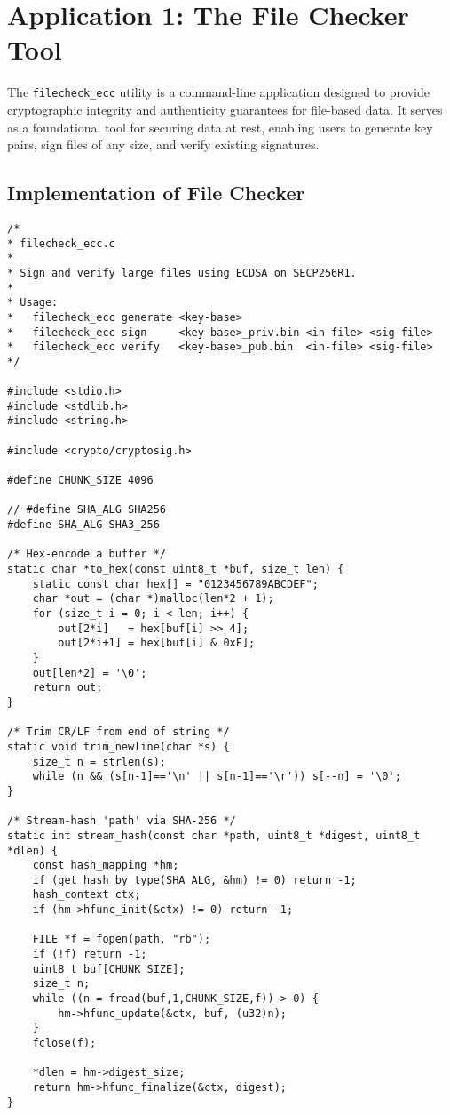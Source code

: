 \chapter{Application 1: The File Checker Tool}
The \texttt{filecheck\_ecc} utility is a command-line application designed to provide cryptographic integrity and authenticity guarantees for file-based data. It serves as a foundational tool for securing data at rest, enabling users to generate key pairs, sign files of any size, and verify existing signatures.

\section{Implementation of File Checker}
\begin{lstlisting}[style=cstyle]
/*
* filecheck_ecc.c
*
* Sign and verify large files using ECDSA on SECP256R1.
*
* Usage:
*   filecheck_ecc generate <key-base>
*   filecheck_ecc sign     <key-base>_priv.bin <in-file> <sig-file>
*   filecheck_ecc verify   <key-base>_pub.bin  <in-file> <sig-file>
*/

#include <stdio.h>
#include <stdlib.h>
#include <string.h>

#include <crypto/cryptosig.h>

#define CHUNK_SIZE 4096

// #define SHA_ALG SHA256
#define SHA_ALG SHA3_256

/* Hex-encode a buffer */
static char *to_hex(const uint8_t *buf, size_t len) {
	static const char hex[] = "0123456789ABCDEF";
	char *out = (char *)malloc(len*2 + 1);
	for (size_t i = 0; i < len; i++) {
		out[2*i]   = hex[buf[i] >> 4];
		out[2*i+1] = hex[buf[i] & 0xF];
	}
	out[len*2] = '\0';
	return out;
}

/* Trim CR/LF from end of string */
static void trim_newline(char *s) {
	size_t n = strlen(s);
	while (n && (s[n-1]=='\n' || s[n-1]=='\r')) s[--n] = '\0';
}

/* Stream-hash 'path' via SHA-256 */
static int stream_hash(const char *path, uint8_t *digest, uint8_t *dlen) {
	const hash_mapping *hm;
	if (get_hash_by_type(SHA_ALG, &hm) != 0) return -1;
	hash_context ctx;
	if (hm->hfunc_init(&ctx) != 0) return -1;
	
	FILE *f = fopen(path, "rb");
	if (!f) return -1;
	uint8_t buf[CHUNK_SIZE];
	size_t n;
	while ((n = fread(buf,1,CHUNK_SIZE,f)) > 0) {
		hm->hfunc_update(&ctx, buf, (u32)n);
	}
	fclose(f);
	
	*dlen = hm->digest_size;
	return hm->hfunc_finalize(&ctx, digest);
}


\end{lstlisting}
